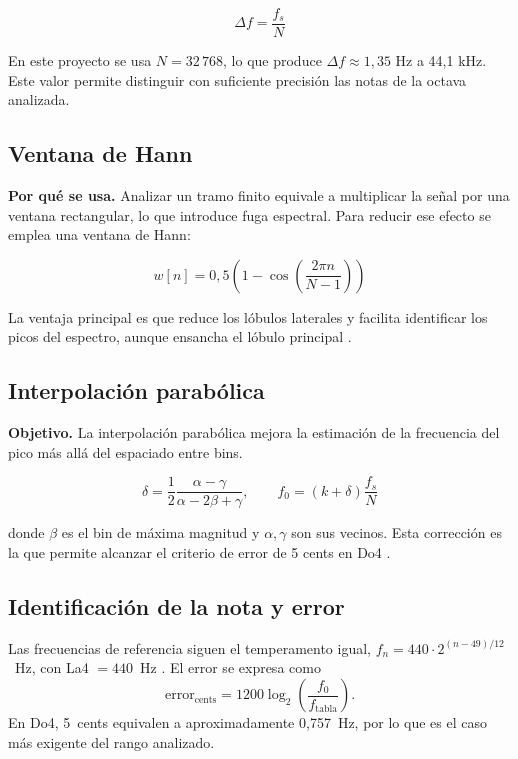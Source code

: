 \documentclass[12pt]{article}
\begin{document}
\begin{equation}
\Delta f = \frac{f_s}{N}
\end{equation}

En este proyecto se usa $N=32\,768$, lo que produce
$\Delta f \approx 1{,}35$ Hz a 44,1 kHz. Este valor permite distinguir con suficiente
precisión las notas de la octava analizada.

\subsection{Ventana de Hann}

\textbf{Por qué se usa.}
Analizar un tramo finito equivale a multiplicar la señal por una ventana rectangular,
lo que introduce fuga espectral. Para reducir ese efecto se emplea una ventana de Hann:

\begin{equation}
w[n] = 0{,}5\left(1-\cos\left(\frac{2\pi n}{N-1}\right)\right)
\end{equation}

La ventaja principal es que reduce los lóbulos laterales y facilita identificar los
picos del espectro, aunque ensancha el lóbulo principal \cite{harris1978windows}.

\subsection{Interpolación parabólica}

\textbf{Objetivo.}
La interpolación parabólica mejora la estimación de la frecuencia del pico más allá
del espaciado entre bins.

\begin{equation}
\delta = \frac{1}{2}\frac{\alpha-\gamma}{\alpha-2\beta+\gamma},
\qquad
f_0=(k+\delta)\frac{f_s}{N}
\label{eq:interp}
\end{equation}

donde $\beta$ es el bin de máxima magnitud y $\alpha,\gamma$ son sus vecinos.
Esta corrección es la que permite alcanzar el criterio de error de 5 cents en Do4
\cite{smith2007mdft}.

\subsection{Identificación de la nota y error}
Las frecuencias de referencia siguen el temperamento igual,
$f_n=440\cdot2^{(n-49)/12}$~Hz, con La4 $=440$~Hz \cite{iso16-1975}. El error se
expresa como
\begin{equation}
  \text{error}_{\text{cents}}
  =1200\log_2\!\left(\frac{f_0}{f_{\text{tabla}}}\right).
  \label{eq:cents}
\end{equation}
En Do4, 5~cents equivalen a aproximadamente 0,757~Hz, por lo que es el caso más
exigente del rango analizado.
\end{document}

